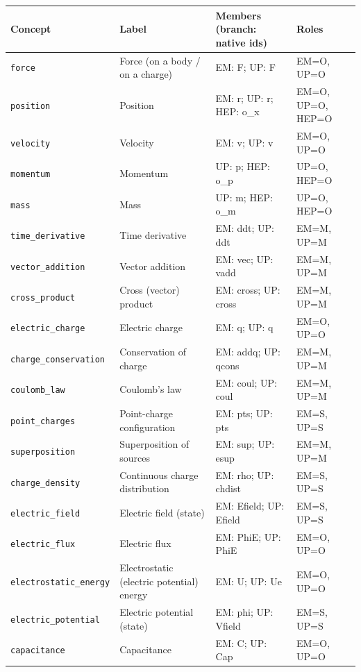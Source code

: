 \begin{longtable}{@{}p{3.1cm}p{3.6cm}p{5.0cm}p{2.9cm}@{}}\toprule
Concept & Label & Members (branch: native ids) & Roles \\\midrule\endhead
\texttt{force} & Force (on a body / on a charge) & EM: F; UP: F & EM=O, UP=O \\
\texttt{position} & Position & EM: r; UP: r; HEP: o\_x & EM=O, UP=O, HEP=O \\
\texttt{velocity} & Velocity & EM: v; UP: v & EM=O, UP=O \\
\texttt{momentum} & Momentum & UP: p; HEP: o\_p & UP=O, HEP=O \\
\texttt{mass} & Mass & UP: m; HEP: o\_m & UP=O, HEP=O \\
\texttt{time\_\allowbreak{{}}derivative} & Time derivative & EM: ddt; UP: ddt & EM=M, UP=M \\
\texttt{vector\_\allowbreak{{}}addition} & Vector addition & EM: vec; UP: vadd & EM=M, UP=M \\
\texttt{cross\_\allowbreak{{}}product} & Cross (vector) product & EM: cross; UP: cross & EM=M, UP=M \\
\texttt{electric\_\allowbreak{{}}charge} & Electric charge & EM: q; UP: q & EM=O, UP=O \\
\texttt{charge\_\allowbreak{{}}conservation} & Conservation of charge & EM: addq; UP: qcons & EM=M, UP=M \\
\texttt{coulomb\_\allowbreak{{}}law} & Coulomb's law & EM: coul; UP: coul & EM=M, UP=M \\
\texttt{point\_\allowbreak{{}}charges} & Point-charge configuration & EM: pts; UP: pts & EM=S, UP=S \\
\texttt{superposition} & Superposition of sources & EM: sup; UP: esup & EM=M, UP=M \\
\texttt{charge\_\allowbreak{{}}density} & Continuous charge distribution & EM: rho; UP: chdist & EM=S, UP=S \\
\texttt{electric\_\allowbreak{{}}field} & Electric field (state) & EM: Efield; UP: Efield & EM=S, UP=S \\
\texttt{electric\_\allowbreak{{}}flux} & Electric flux & EM: PhiE; UP: PhiE & EM=O, UP=O \\
\texttt{electrostatic\_\allowbreak{{}}energy} & Electrostatic (electric potential) energy & EM: U; UP: Ue & EM=O, UP=O \\
\texttt{electric\_\allowbreak{{}}potential} & Electric potential (state) & EM: phi; UP: Vfield & EM=S, UP=S \\
\texttt{capacitance} & Capacitance & EM: C; UP: Cap & EM=O, UP=O \\

\end{longtable}
